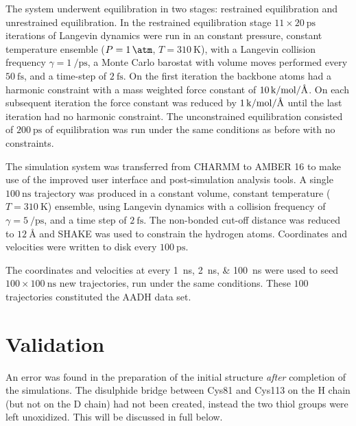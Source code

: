 The system underwent equilibration in two stages: restrained equilibration and unrestrained equilibration. In the restrained equilibration stage $11 \times \SI{20}{\pico\second}$ iterations of Langevin dynamics were run in an constant pressure, constant temperature ensemble ($P=\SI{1}{\atm}$, $T=\SI{310}{\kelvin}$), with a Langevin collision frequency $\gamma=\SI{1}{\per\pico\second}$, a Monte Carlo barostat with volume moves performed every  $\SI{50}{\femto\second}$, and a time-step of $\SI{2}{\femto\second}$. On the first iteration the backbone atoms had a harmonic constraint with a mass weighted force constant of  $\SI{10}{\kilo\cal\per\mol\per\angstrom}$. On each subsequent iteration the force constant was reduced by $\SI{1}{\kilo\cal\per\mol\per\angstrom}$ until the last iteration had no harmonic constraint. The unconstrained equilibration consisted of $\SI{200}{\pico\second}$ of equilibration was run under the same conditions as before with no constraints. 

The simulation system was transferred from CHARMM to AMBER 16 \cite{caseAMBER} to make use of the improved user interface and post-simulation analysis tools. A single  $\SI{100}{\nano\second}$ trajectory was produced in a constant volume, constant temperature ($T=\SI{310}{\kelvin}$) ensemble, using Langevin dynamics with a collision frequency of $\gamma=\SI{5}{\per\pico\second}$, and a time step of $\SI{2}{\femto\second}$. The non-bonded cut-off distance was reduced to $\SI{12}{\angstrom}$ and SHAKE was used to constrain the hydrogen atoms. Coordinates and velocities were written to disk every $\SI{100}{\pico\second}$.  

The coordinates and velocities at every \SIlist[list-final-separator = { ... }]{1; 2; 100}{\nano\second} were used to seed $100 \times \SI{100}{\nano\second}$ new trajectories, run under the same conditions. These $100$ trajectories constituted the AADH data set. 

\section{Validation}\label{sec:aadh_validation}

An error was found in the preparation of the initial structure \emph{after} completion of the simulations. The disulphide bridge between Cys81 and Cys113 on the H chain (but not on the D chain) had not been created, instead the two thiol groups were left unoxidized. This will be discussed in full below. 


